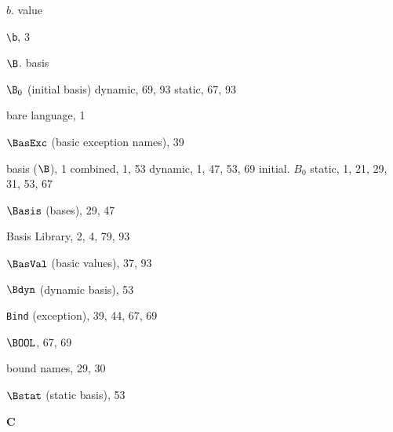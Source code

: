 \begin{theindex}
\indexspace
\item $b$. \see value
\item \verb+\b+, 3
\item $\B$. \see basis
\item $\B_0$ (initial basis)
\subitem dynamic, 69, 93
\subitem static, 67, 93
\item bare language, 1
\item $\BasExc$ (basic exception names), 39
\item basis ($\B$), 1
\subitem combined, 1, 53
\subitem dynamic, 1, 47, 53, 69
\subitem initial. \see $B_0$
\subitem static, 1, 21, 29, 31, 53, 67
\item $\Basis$ (bases), 29, 47
\item Basis Library, 2, 4, 79, 93
\item $\BasVal$ (basic values), 37, 93
\item $\Bdyn$ (dynamic basis), 53
\item {\tt Bind} (exception), 39, 44, 67, 69
\item $\BOOL$, 67, 69
\item bound names, 29, 30
\item $\Bstat$ (static basis), 53
\indexspace

\parbox{65mm}{\hfil{\large\bf C}\hfil}

\indexspace


\end{theindex}
